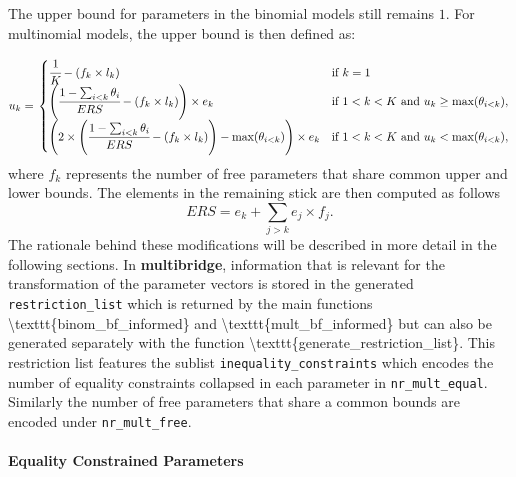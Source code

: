 \begin{appendix}
The upper bound for parameters in the binomial models still remains
\(1\). For multinomial models, the upper bound is then defined as:

\begin{align}
  u_k = \left.
  \begin{cases}
      \cfrac{1}{K} - (f_k \times l_k) & \text{if } k = 1 \\
     \left( \cfrac{1 - \sum_{i < k} \theta_i}{ERS} - (f_k \times l_k) \right) \times e_k & \text{if } 1 < k < K \text{ and } u_k \geq \text{max}(\theta_{i < k}), \\
    \left( 2 \times \left( \cfrac{1 - \sum_{i < k} \theta_i}{ERS} - (f_k \times l_k) \right) - \text{max}(\theta_{i < k}) \right)  \times e_k & \text{if } 1 < k < K \text{ and } u_k < \text{max}(\theta_{i < k}),
  \end{cases}
    \right.
\end{align} where \(f_k\) represents the number of free parameters that
share common upper and lower bounds. The elements in the remaining stick
are then computed as follows
\[ERS = e_k + \sum_{j > k} e_j \times f_j.\] The rationale behind these
modifications will be described in more detail in the following
sections. In \textbf{multibridge}, information that is relevant for the
transformation of the parameter vectors is stored in the generated
\texttt{restriction\_list} which is returned by the main functions
\textbackslash texttt\{binom\_bf\_informed\} and
\textbackslash texttt\{mult\_bf\_informed\} but can also be generated
separately with the function
\textbackslash texttt\{generate\_restriction\_list\}. This restriction
list features the sublist \texttt{inequality\_constraints} which encodes
the number of equality constraints collapsed in each parameter in
\texttt{nr\_mult\_equal}. Similarly the number of free parameters that
share a common bounds are encoded under \texttt{nr\_mult\_free}.

\hypertarget{equality-constrained-parameters}{%
\paragraph{Equality Constrained
Parameters}\label{equality-constrained-parameters}}


\end{appendix}
